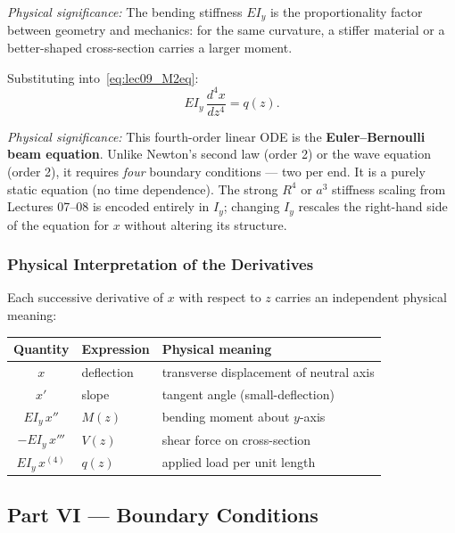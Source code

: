 \documentclass[../main.tex]{subfiles}
\begin{document}
\textit{Physical significance:} The bending stiffness $EI_y$ is the proportionality factor between geometry and mechanics: for the same curvature, a stiffer material or a better-shaped cross-section carries a larger moment.

Substituting into~\eqref{eq:lec09_M2eq}:
\begin{equation}
  \boxed{E I_y\,\frac{d^4 x}{dz^4} = q(z).}
  \label{eq:lec09_EB}
\end{equation}

\textit{Physical significance:} This fourth-order linear ODE is the \textbf{Euler–Bernoulli beam equation}. Unlike Newton's second law (order 2) or the wave equation (order 2), it requires \emph{four} boundary conditions — two per end. It is a purely static equation (no time dependence). The strong $R^4$ or $a^3$ stiffness scaling from Lectures 07–08 is encoded entirely in $I_y$; changing $I_y$ rescales the right-hand side of the equation for $x$ without altering its structure.

\subsubsection*{Physical Interpretation of the Derivatives}

Each successive derivative of $x$ with respect to $z$ carries an independent physical meaning:

\begin{center}
\renewcommand{\arraystretch}{1.65}
\begin{tabular}{cll}
  \toprule
  Quantity & Expression & Physical meaning \\
  \midrule
  $x$                 & deflection                    & transverse displacement of neutral axis \\
  $x'$                & slope                         & tangent angle (small-deflection) \\
  $EI_y\,x''$         & $M(z)$                        & bending moment about $y$-axis \\
  $-EI_y\,x'''$       & $V(z)$                        & shear force on cross-section \\
  $EI_y\,x^{(4)}$     & $q(z)$                        & applied load per unit length \\
  \bottomrule
\end{tabular}
\end{center}

\subsection*{Part VI — Boundary Conditions}
\end{document}
